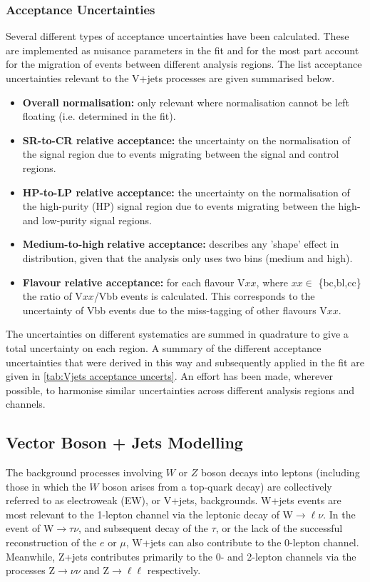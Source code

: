 \subsubsection{Acceptance Uncertainties}
Several different types of acceptance uncertainties have been calculated. These are implemented as nuisance parameters in the fit and for the most part account for the migration of events between different analysis regions. The list acceptance uncertainties relevant to the V+jets processes are given summarised below.
%
\begin{itemize}
    \item \textbf{Overall normalisation:} only relevant where normalisation cannot be left floating (i.e. determined in the fit).
    \item \textbf{SR-to-CR relative acceptance:} the uncertainty on the normalisation of the signal region due to events migrating between the signal and control regions.
    \item \textbf{HP-to-LP relative acceptance:} the uncertainty on the normalisation of the high-purity (HP) signal region due to events migrating between the high- and low-purity signal regions.
    \item \textbf{Medium-to-high} \pTV \textbf{relative acceptance:} describes any 'shape' effect in \pTV distribution, given that the analysis only uses two \pTV bins (medium and high).
    \item \textbf{Flavour relative acceptance:} for each flavour V$xx$, where $xx\in$ \{bc,bl,cc\} the ratio of V$xx$/Vbb events is calculated. This corresponds to the uncertainty of Vbb events due to the miss-tagging of other flavours V$xx$. 
\end{itemize}
%
The uncertainties on different systematics are summed in quadrature to give a total uncertainty on each region. A summary of the different acceptance uncertainties that were derived in this way and subsequently applied in the fit are given in \cref{tab:Vjets acceptance uncerts}. An effort has been made, wherever possible, to harmonise similar uncertainties across different analysis regions and channels.


\subsection{Vector Boson + Jets Modelling}
The background processes involving $W$ or $Z$ boson decays into leptons (including those in which the $W$ boson arises from a top-quark decay) are collectively referred to as electroweak (EW), or V+jets, backgrounds. W+jets events are most relevant to the 1-lepton channel via the leptonic decay of W$\rightarrow \ell\nu$. In the event of W$\rightarrow \tau\nu$, and subsequent decay of the $\tau$, or the lack of the successful reconstruction of the $e$ or $\mu$, W+jets can also contribute to the 0-lepton channel. Meanwhile, Z+jets contributes primarily to the 0- and 2-lepton channels via the processes Z$\rightarrow \nu\nu$ and Z$\rightarrow \ell\ell$ respectively.

